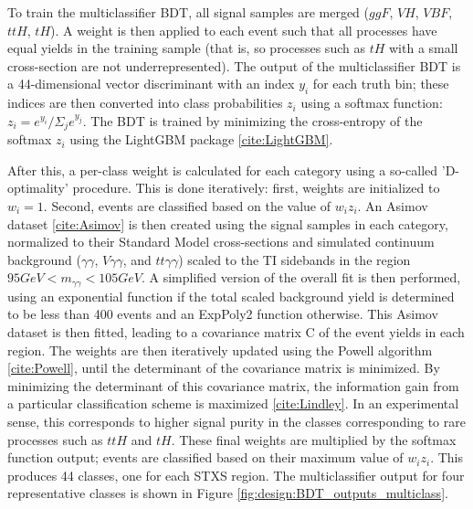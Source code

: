 To train the multiclassifier BDT, all signal samples are merged ($ggF$, $VH$, $VBF$, $ttH$, $tH$). A weight is then applied to each event such that all processes have equal yields in the training sample (that is, so processes such as $tH$ with a small cross-section are not underrepresented). The output of the multiclassifier BDT is a 44-dimensional vector discriminant with an index $y_{i}$ for each truth bin; these indices are then converted into class probabilities $z_{i}$ using a softmax function: $z_{i} = e^{y_{i}}/{\Sigma_{j}e^{y_{j}}}$. The BDT is trained by minimizing the cross-entropy of the softmax $z_{i}$ using the LightGBM package \ref{cite:LightGBM}.

After this, a per-class weight is calculated for each category using a so-called 'D-optimality' procedure. This is done iteratively: first, weights are initialized to $w_{i} = 1$. Second, events are classified based on the value of $w_{i}z_{i}$. An Asimov dataset \ref{cite:Asimov} is then created using the signal samples in each category, normalized to their Standard Model cross-sections and simulated continuum background ($\gamma\gamma$, $V\gamma\gamma$, and $tt\gamma\gamma$) scaled to the TI sidebands in the region $95 GeV < m_{\gamma \gamma} < 105 GeV$. A simplified version of the overall fit is then performed, using an exponential function if the total scaled background yield is determined to be less than 400 events and an ExpPoly2 function otherwise. This Asimov dataset is then fitted, leading to a covariance matrix C of the event yields in each region. The weights are then iteratively updated using the Powell algorithm \ref{cite:Powell}, until the determinant of the covariance matrix is minimized. By minimizing the determinant of this covariance matrix, the information gain from a particular classification scheme is maximized \ref{cite:Lindley}. In an experimental sense, this corresponds to higher signal purity in the classes corresponding to rare processes such as $ttH$ and $tH$. These final weights are multiplied by the softmax function output; events are classified based on their maximum value of $w_{i}z_{i}$. This produces 44 classes, one for each STXS region. The multiclassifier output for four representative classes is shown in Figure \ref{fig:design:BDT_outputs_multiclass}.


